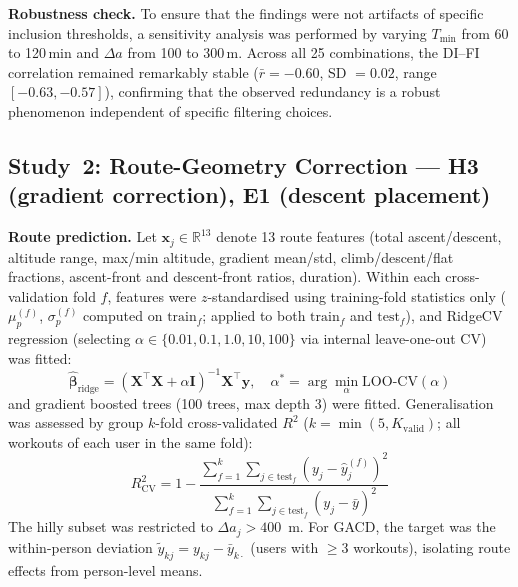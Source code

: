 \documentclass[times, twoside]{zHenriquesLab-StyleBioRxiv}
\begin{document}
\textbf{Robustness check.} To ensure that the findings were not artifacts of specific inclusion thresholds, a sensitivity analysis was performed by varying $T_{\text{min}}$ from 60 to 120\,min and $\Delta a$ from 100 to 300\,m. Across all 25 combinations, the DI--FI correlation remained remarkably stable ($\bar{r} = -0.60$, SD $= 0.02$, range $[-0.63, -0.57]$), confirming that the observed redundancy is a robust phenomenon independent of specific filtering choices.

\subsection*{Study~2: Route-Geometry Correction --- H3 (gradient correction), E1 (descent placement)}

\textbf{Route prediction.} Let $\mathbf{x}_j \in \mathbb{R}^{13}$ denote 13 route features (total ascent/descent, altitude range, max/min altitude, gradient mean/std, climb/descent/flat fractions, ascent-front and descent-front ratios, duration). Within each cross-validation fold $f$, features were $z$-standardised using training-fold statistics only ($\mu^{(f)}_p$, $\sigma^{(f)}_p$ computed on $\text{train}_f$; applied to both $\text{train}_f$ and $\text{test}_f$), and RidgeCV regression (selecting $\alpha \in \{0.01, 0.1, 1.0, 10, 100\}$ via internal leave-one-out CV) was fitted:
\[
  \hat{\boldsymbol{\beta}}_{\text{ridge}} = (\mathbf{X}^\top \mathbf{X} + \alpha \mathbf{I})^{-1} \mathbf{X}^\top \mathbf{y}, \quad \alpha^* = \arg\min_{\alpha} \text{LOO-CV}(\alpha)
\]
and gradient boosted trees (100 trees, max depth 3) were fitted. Generalisation was assessed by group $k$-fold cross-validated $R^2$ ($k = \min(5, K_{\text{valid}})$; all workouts of each user in the same fold):
\[
  R^2_{\text{CV}} = 1 - \frac{\sum_{f=1}^{k} \sum_{j \in \text{test}_f} (y_j - \hat{y}_j^{(f)})^2}{\sum_{f=1}^{k} \sum_{j \in \text{test}_f} (y_j - \bar{y})^2}
\]
The hilly subset was restricted to $\Delta a_j > 400$~m. For GACD, the target was the within-person deviation $\tilde{y}_{kj} = y_{kj} - \bar{y}_{k\cdot}$ (users with $\geq 3$ workouts), isolating route effects from person-level means.
\end{document}
